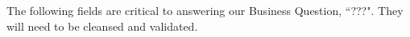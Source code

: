 \documentclass{article}
\begin{document}



The following fields are critical to answering our Business Question, ``???".
They will need to be cleansed and validated.





\end{document}
